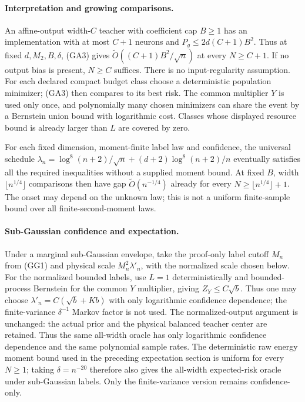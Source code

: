 \paragraph{Interpretation and growing comparisons.}
An affine-output width-$C$ teacher with coefficient cap $B\ge1$
has an implementation with at most $C+1$ neurons and
$P_g\le2d(C+1)B^2$. Thus at fixed $d,M_2,B,\delta$, (GA3) gives
$\widetilde O((C+1)B^2/\sqrt n)$ at every $N\ge C+1$.
If no output bias is present, $N\ge C$ suffices.
There is no input-regularity assumption.
For each declared compact budget class choose a deterministic
population minimizer; (GA3) then compares to its best risk.
The common multiplier $Y$ is used only once, and polynomially many
chosen minimizers can share the event by a Bernstein union bound
with logarithmic cost. Classes whose displayed resource bound is
already larger than $L$ are covered by zero.

For each fixed dimension, moment-finite label law and confidence,
the universal schedule
$\lambda_n=\log^8(n+2)/\sqrt n+(d+2)\log^8(n+2)/n$
eventually satisfies all the required inequalities without a supplied
moment bound. At fixed $B$, width $\lfloor n^{1/4}\rfloor$
comparisons then have gap $\widetilde O(n^{-1/4})$ already for every
$N\ge\lfloor n^{1/4}\rfloor+1$.
The onset may depend on the unknown law; this is not a uniform
finite-sample bound over all finite-second-moment laws.

\paragraph{Sub-Gaussian confidence and expectation.}
Under a marginal sub-Gaussian envelope, take the proof-only label
cutoff $M_n$ from (GG1) and physical scale $M_n^2\lambda'_n$, with
the normalized scale chosen below.
For the normalized bounded labels, use $L=1$ deterministically and
bounded-process Bernstein for the common $Y$ multiplier, giving
$Z_Y\le C\sqrt b$. Thus one may choose
$\lambda'_n=C(\sqrt b+Kb)$ with only logarithmic confidence
dependence; the finite-variance $\delta^{-1}$ Markov factor is not
used. The normalized-output argument is
unchanged: the actual prior and the physical balanced teacher center
are retained. Thus the same all-width oracle has only logarithmic
confidence dependence and the same polynomial sample rates.
The deterministic raw energy moment bound used in the preceding
expectation section is uniform for every $N\ge1$; taking
$\delta=n^{-20}$ therefore also gives the all-width expected-risk
oracle under sub-Gaussian labels. Only the finite-variance version
remains confidence-only.
